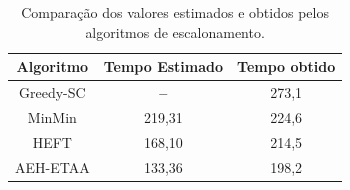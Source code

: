 \begin{table}[H]
\small
\begin{center}
\caption{Comparação dos valores estimados e obtidos pelos algoritmos de escalonamento.}
\label{tabelaEstimativa}
\begin{tabular}{|c|c|c|}
\hline
\textbf{Algoritmo} & \textbf{Tempo Estimado} & \textbf{Tempo obtido} \\
\hline
\hline
Greedy-SC   &  \textbf{--} & 273,1\\
MinMin      & 219,31 & 224,6 \\ 
HEFT        & 168,10 & 214,5\\
AEH-ETAA    & 133,36 & 198,2\\
\hline
\end{tabular}
\end{center}
\end{table}	











